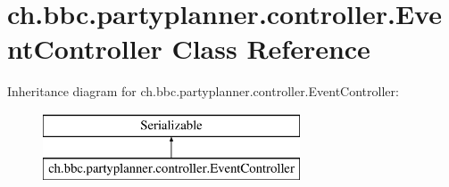 \hypertarget{classch_1_1bbc_1_1partyplanner_1_1controller_1_1_event_controller}{}\section{ch.\+bbc.\+partyplanner.\+controller.\+Event\+Controller Class Reference}
\label{classch_1_1bbc_1_1partyplanner_1_1controller_1_1_event_controller}
Inheritance diagram for ch.\+bbc.\+partyplanner.\+controller.\+Event\+Controller\+:\begin{figure}[H]
\begin{center}
\leavevmode
\includegraphics[height=2.000000cm]{classch_1_1bbc_1_1partyplanner_1_1controller_1_1_event_controller}
\end{center}
\end{figure}
